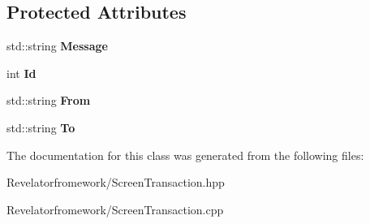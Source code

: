 \subsection*{Protected Attributes}
\begin{DoxyCompactItemize}
\item 
\hypertarget{class_screen_transaction_a212573d9bccda5210fb4bf82211fce07}{std\-::string {\bfseries Message}}\label{class_screen_transaction_a212573d9bccda5210fb4bf82211fce07}

\item 
\hypertarget{class_screen_transaction_acc2108d68c434499915514c1046d9806}{int {\bfseries Id}}\label{class_screen_transaction_acc2108d68c434499915514c1046d9806}

\item 
\hypertarget{class_screen_transaction_a6beff6473b1f9537a68feede691526e2}{std\-::string {\bfseries From}}\label{class_screen_transaction_a6beff6473b1f9537a68feede691526e2}

\item 
\hypertarget{class_screen_transaction_acadac834d980c73ac6084fb52a7f882c}{std\-::string {\bfseries To}}\label{class_screen_transaction_acadac834d980c73ac6084fb52a7f882c}

\end{DoxyCompactItemize}


The documentation for this class was generated from the following files\-:\begin{DoxyCompactItemize}
\item 
Revelatorfromework/Screen\-Transaction.\-hpp\item 
Revelatorfromework/Screen\-Transaction.\-cpp\end{DoxyCompactItemize}
